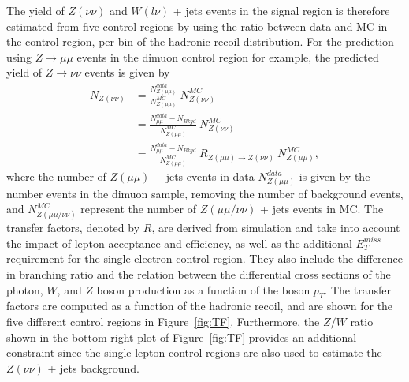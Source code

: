 The yield of $Z(\nu\nu)$ and $W(l\nu)$ + jets events in the signal region is therefore estimated from five control regions by using the ratio between data and MC in the control region, per bin of the hadronic recoil distribution. For the prediction using $Z\rightarrow \mu\mu$ events in the dimuon control region for example, the predicted yield of $Z\rightarrow\nu\nu$ events is given by
\begin{align}
 N_{Z(\nu\nu)} &= \frac{N_{Z(\mu\mu)}^{data}}{N_{Z(\mu\mu)}^{MC}}\ N_{Z(\nu\nu)}^{MC}\\
 &= \frac{N_{\mu\mu}^{data} - N_{Bkgd}}{N_{Z(\mu\mu)}^{MC}}\ N_{Z(\nu\nu)}^{MC} \\
 &= \frac{N_{\mu\mu}^{data} - N_{Bkgd}}{N_{Z(\mu\mu)}^{MC}}\ R_{Z(\mu\mu)\rightarrow Z(\nu\nu)}\ N_{Z(\mu\mu)}^{MC},
\end{align}
where the number of $Z(\mu\mu)$ + jets events in data $N_{Z(\mu\mu)}^{data}$ is given by the number events in the dimuon sample, removing the number of background events, and $N_{Z(\mu\mu/\nu\nu)}^{MC}$ represent the number of $Z(\mu\mu/\nu\nu)$ + jets events in MC. The transfer factors, denoted by $R$, are derived from simulation and take into account the impact of lepton acceptance and efficiency, as well as the additional $E_T^{miss}$ requirement for the single electron control region. They also include the difference in branching ratio and the relation between the differential cross sections of the photon, $W$, and $Z$ boson production as a function of the boson $p_T$. The transfer factors are computed as a function of the hadronic recoil, and are shown for the five different control regions in Figure~\ref{fig:TF}. Furthermore, the $Z/W$ ratio shown in the bottom right plot of Figure~\ref{fig:TF} provides an additional constraint since the single lepton control regions are also used to  estimate the $Z(\nu\nu)$ + jets background.

